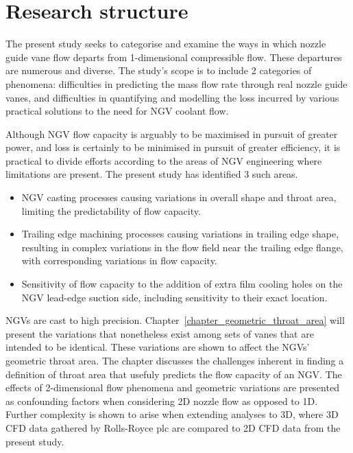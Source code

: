 \documentclass[a4paper, 11pt, twoside]{report}
\begin{document}
\section{Research structure}
\label{research_structure}

The present study seeks to categorise and examine the ways in which nozzle guide vane flow departs from 1-dimensional compressible flow. These departures are numerous and diverse. The study's scope is to include 2 categories of phenomena: difficulties in predicting the mass flow rate through real nozzle guide vanes, and difficulties in quantifying and modelling the loss incurred by various practical solutions to the need for NGV coolant flow.

Although NGV flow capacity is arguably to be maximised in pursuit of greater power, and loss is certainly to be minimised in pursuit of greater efficiency, it is practical to divide efforts according to the areas of NGV engineering where limitations are present. The present study has identified 3 such areas.
\begin{itemize}
	\item NGV casting processes causing variations in overall shape and throat area, limiting the predictability of flow capacity.
	\item Trailing edge machining processes causing variations in trailing edge shape, resulting in complex variations in the flow field near the trailing edge flange, with corresponding variations in flow capacity.
	\item Sensitivity of flow capacity to the addition of extra film cooling holes on the NGV lead-edge suction side, including sensitivity to their exact location.
\end{itemize}

NGVs are cast to high precision. Chapter~\ref{chapter_geometric_throat_area} will present the variations that nonetheless exist among sets of vanes that are intended to be identical. These variations are shown to affect the NGVs' geometric throat area. The chapter discusses the challenges inherent in finding a definition of throat area that usefuly predicts the flow capacity of an NGV. The effects of 2-dimensional flow phenomena and geometric variations are presented as confounding factors when considering 2D nozzle flow as opposed to 1D. Further complexity is shown to arise when extending analyses to 3D, where 3D CFD data gathered by Rolls-Royce plc are compared to 2D CFD data from the present study.
\end{document}
